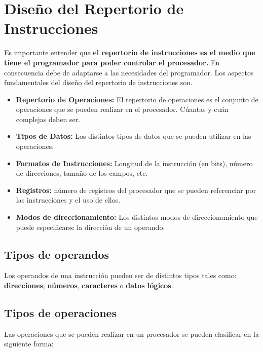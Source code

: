 \documentclass{article}
\begin{document}
\section*{Dise\~{n}o del Repertorio de Instrucciones}
Es importante entender que \textbf{el repertorio de instrucciones es el medio que tiene
    el programador para poder controlar el procesador.} En consecuencia debe de adaptarse
a las necesidades del programador. Los aspectos fundamentales del dise\~{n}o del
repertorio de instrucciones son.

\begin{itemize}
    \item \textbf{Repertorio de Operaciones:}
          El repertorio de operaciones es el conjunto de operaciones que se
          pueden realizar en el procesador. C\'{u}antas y cu\'{a}n complejas deben ser.
    \item \textbf{Tipos de Datos:}
          Los distintos tipos de datos que se pueden utilizar en las operaciones.
    \item \textbf{Formatos de Instrucciones:}
          Longitud de la instrucci\'{o}n (en bits), n\'{u}mero de direcciones,
          tama\~{n}o de los campos, etc.
    \item \textbf{Registros:} n\'{u}mero de registros del procesador que se
          pueden referenciar por las instrucciones y el uso de ellos.
    \item \textbf{Modos de direccionamiento:}
          Los distintos modos de direccionamiento que puede especificarse la
          direcci\'{o}n de un operando.
\end{itemize}

\subsection*{Tipos de operandos}
Los operandos de una instrucci\'{o}n pueden ser de distintos tipos tales como:
\textbf{direcciones}, \textbf{n\'{u}meros}, \textbf{caracteres} o
\textbf{datos l\'{o}gicos}.

\subsection*{Tipos de operaciones}
Las operaciones que se pueden realizar en un procesador se pueden clasificar
en la siguiente forma:
\end{document}
